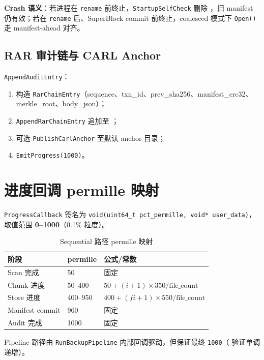 \textbf{Crash 语义}：若进程在 \texttt{rename} 前终止，\texttt{StartupSelfCheck} 删除 ，旧 manifest 仍有效；若在 \texttt{rename} 后、SuperBlock commit 前终止，coalesced 模式下 \texttt{Open()} 走 manifest-ahead 对齐。

\subsection{RAR 审计链与 CARL Anchor}

\texttt{AppendAuditEntry}：
\begin{enumerate}[nosep]
  \item 构造 \texttt{RarChainEntry}（sequence、txn\_id、prev\_sha256、manifest\_crc32、merkle\_root、body\_json）；
  \item \texttt{AppendRarChainEntry} 追加至 ；
  \item 可选 \texttt{PublishCarlAnchor} 至默认 anchor 目录；
  \item \texttt{EmitProgress(1000)}。
\end{enumerate}

\section{进度回调 permille 映射}
\label{sec:be-progress}

\texttt{ProgressCallback} 签名为 \texttt{void(uint64\_t pct\_permille, void* user\_data)}，取值范围 \textbf{0--1000}（0.1\% 粒度）。

\begin{table}[htbp]
\centering
\caption{Sequential 路径 permille 映射}
\label{tab:progress-permille}
\begin{tabular}{@{}llp{6.5cm}@{}}
\toprule
阶段 & permille & 公式/常数 \\
\midrule
Scan 完成 & 50 & 固定 \\
Chunk 进度 & 50--400 & $50 + (i+1) \times 350 / \text{file\_count}$ \\
Store 进度 & 400--950 & $400 + (fi+1) \times 550 / \text{file\_count}$ \\
Manifest commit & 960 & 固定 \\
Audit 完成 & 1000 & 固定 \\
\bottomrule
\end{tabular}
\end{table}

Pipeline 路径由 \texttt{RunBackupPipeline} 内部回调驱动，但保证最终 \texttt{1000}（ 验证单调递增）。

